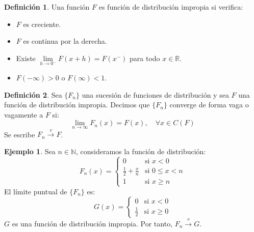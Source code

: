 \documentclass{report}
\theoremstyle{remark}
\theoremstyle{remark}
\theoremstyle{remark}
\theoremstyle{definition}
\newtheorem{definition}{Definición}[chapter]
\theoremstyle{definition}
\theoremstyle{definition}
\newtheorem*{example}{Ejemplo}
\theoremstyle{definition}
\begin{document}
\begin{definition}
    Una función $F$ es función de distribución impropia si verifica:
    \begin{itemize}
        \item $F$ es creciente.
        \item $F$ es continua por la derecha.
        \item Existe $\lim\limits_{h \to 0^-} F(x+h) = F(x^-)$ para todo $x \in \mathbb{R}$.
        \item $F(-\infty) > 0$ o $F(\infty) < 1$.
    \end{itemize}
\end{definition}

\begin{definition}
    Sea $\{F_n\}$ una sucesión de funciones de distribución y sea $F$ una función de distribución impropia.
    Decimos que $\{F_n\}$ converge de forma vaga o vagamente a $F$ si:
    $$\lim\limits_{n \to \infty} F_n(x) = F(x), \quad \forall x \in C(F)$$
    Se escribe $F_n \xrightarrow{v} F$.
\end{definition}

\begin{example}
    Sea $n \in \mathbb{N}$, consideramos la función de distribución:
    $$F_n(x) = \begin{cases}
            0                         & \text{si } x < 0        \\
            \frac{1}{2} + \frac{x}{n} & \text{si } 0 \leq x < n \\
            1                         & \text{si } x \geq n
        \end{cases}$$
    El límite puntual de $\{F_n\}$ es:
    $$G(x) = \begin{cases}
            0           & \text{si } x < 0    \\
            \frac{1}{2} & \text{si } x \geq 0
        \end{cases}$$
    $G$ es una función de distribución impropia.
    Por tanto, $F_n \xrightarrow{v} G$.
\end{example}
\end{document}
